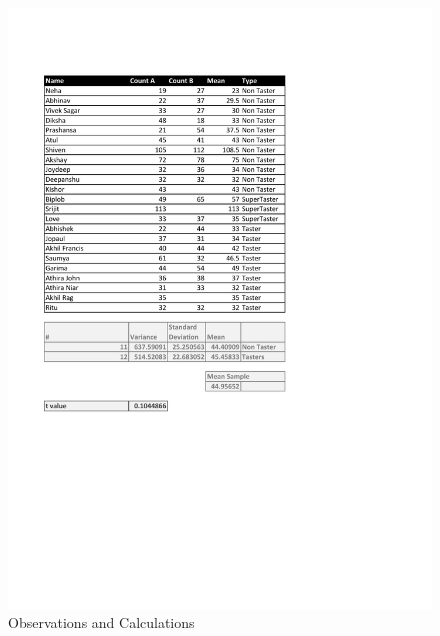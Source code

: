 	\begin{figure}[bth]
		\begin{center}
			\includegraphics[width=1.5\linewidth]{gfx/final_taste}
		\end{center}
	\caption[Observations and Calculations]{Observations and Calculations}
	\label{taste}
	\end{figure}	

